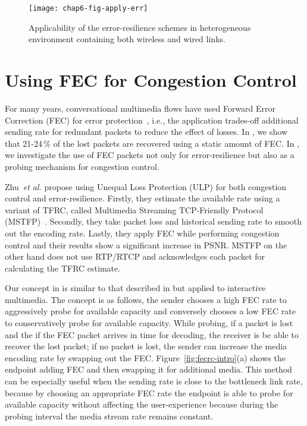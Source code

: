 \begin{figure}
\centerline {
\texttt{[image: chap6-fig-apply-err]}
}
\caption{Applicability of the error-resilience schemes in heterogeneous
environment containing both wireless and wired links.}
\label{fig:apply_err}
\end{figure}


\section{Using FEC for Congestion Control}

For many years, conversational multimedia flows have used Forward Error
Correction (FEC) for error protection~\cite{855913, 664283}, i.e., the
application trades-off additional sending rate for redundant packets to reduce
the effect of losses. In , we show that 21-24\,\% of the lost
packets are recovered using a static amount of FEC. In , we
investigate the use of FEC packets not only for error-resilience but also as a
probing mechanism for congestion control.

Zhu~\textit{et al.}\cite{Zhu:2001tu,springerlink:1022865704606} propose using
Unequal Loss Protection (ULP) for both congestion control and
error-resilience. Firstly, they estimate the available rate using a variant of
TFRC, called Multimedia Streaming TCP-Friendly Protocol (MSTFP)~\cite{871542}.
Secondly, they take packet loss and historical sending rate to smooth out the
encoding rate. Lastly, they apply FEC while performing congestion control and
their results show a significant increase in PSNR. MSTFP on the other hand
does not use RTP/RTCP and acknowledges each packet for calculating the TFRC
estimate.

Our concept in  is similar to that described in
\cite{Zhu:2001tu} but applied to interactive multimedia. The concept is as
follows, the sender chooses a high FEC rate to aggressively probe for
available capacity and conversely chooses a low FEC rate to conservatively
probe for available capacity. While probing, if a packet is lost and the if
the FEC packet arrives in time for decoding, the receiver is be able to
recover the lost packet; if no packet is lost, the sender can increase the
media encoding rate by swapping out the FEC. Figure~\ref{fig:fecrc-intro}(a)
shows the endpoint adding FEC and then swapping it for additional media. This
method can be especially useful when the sending rate is close to the
bottleneck link rate, because by choosing an appropriate FEC rate the endpoint
is able to probe for available capacity without affecting the user-experience
because during the probing interval the media stream rate remains constant.

